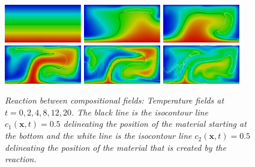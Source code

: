 \documentclass{article}
\begin{document}
\begin{figure}
  \centering
  \includegraphics[width=0.3\textwidth]{cookbooks/composition-reaction/0.png}
  \hfill
  \includegraphics[width=0.3\textwidth]{cookbooks/composition-reaction/2.png}
  \hfill
  \includegraphics[width=0.3\textwidth]{cookbooks/composition-reaction/4.png}
  \\[6pt]
  \includegraphics[width=0.3\textwidth]{cookbooks/composition-reaction/8.png}
  \hfill
  \includegraphics[width=0.3\textwidth]{cookbooks/composition-reaction/12.png}
  \hfill
  \includegraphics[width=0.3\textwidth]{cookbooks/composition-reaction/20.png}
  \caption{\it Reaction between compositional fields: Temperature fields at $t=0, 2, 4, 8,
  12, 20$. The black line is the isocontour line $c_1(\mathbf x,t)=0.5$
    delineating the position of the material starting at the bottom and the white line is the    isocontour line $c_2(\mathbf x,t)=0.5$
    delineating the position of the material that is created by the reaction.}
  \label{fig:composition-reaction}
\end{figure}
\end{document}
